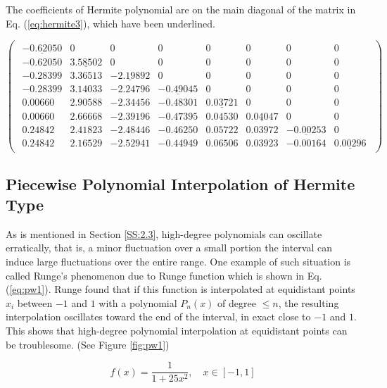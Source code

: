 \documentclass[preprint,12pt]{elsarticle}
\begin{document}
The coefficients of Hermite polynomial are on the main diagonal of the matrix in Eq. (\ref{eq:hermite3}), which have been underlined.

\begin{equation}
\label{eq:hermite3}
    \begin{pmatrix}
        \begin{smallmatrix}
            \underline{-0.62050} & 0 & 0 & 0 & 0 & 0 & 0 & 0\\
            -0.62050 & \underline{3.58502} & 0 & 0 & 0 & 0 & 0 & 0\\
            -0.28399 & 3.36513 & \underline{-2.19892} & 0 & 0 & 0 & 0 & 0\\
            -0.28399 & 3.14033 & -2.24796 & \underline{-0.49045} & 0 & 0 & 0 & 0\\
            0.00660 & 2.90588 & -2.34456 & -0.48301 & \underline{0.03721} & 0 & 0 & 0\\
            0.00660 & 2.66668 & -2.39196 & -0.47395 & 0.04530 & \underline{0.04047} & 0 & 0\\
            0.24842 & 2.41823 & -2.48446 & -0.46250 & 0.05722 & 0.03972 & \underline{-0.00253} & 0\\
            0.24842 & 2.16529 & -2.52941 & -0.44949 & 0.06506 & 0.03923 & -0.00164 & \underline{0.00296}
        \end{smallmatrix}
    \end{pmatrix}
\end{equation}

\subsection{Piecewise Polynomial Interpolation of Hermite Type}
\label{S:3.3}

As is mentioned in Section \ref{SS:2.3}, high-degree polynomials can oscillate erratically, that is, a minor fluctuation over a small portion the interval can induce large fluctuations over the entire range. One example of such situation is called Runge's phenomenon due to Runge function which is shown in Eq. (\ref{eq:pw1}). Runge found that if this function is interpolated at equidistant points $x_i$ between $-1$ and $1$ with a polynomial $P_{n}(x)$ of degree $\leq n$, the resulting interpolation oscillates toward the end of the interval, in exact close to $-1$ and $1$. This shows that high-degree polynomial interpolation at equidistant points can be troublesome. (See Figure \ref{fig:pw1})

\begin{equation}
\label{eq:pw1}
    f(x)=\frac{1}{1+25x^2}, \quad x\in[-1,1]
\end{equation}
\end{document}

